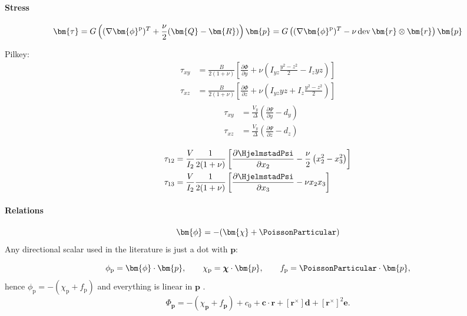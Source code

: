 \paragraph{Stress}
\begin{equation*}
\bm{\tau} = G\left((\nabla \bm{\phi}^{\rm p})^T + \frac{\nu}{2}(\bm{Q} - \bm{R})\right)\bm{p}
= G\left((\nabla \bm{\phi}^{\rm p})^T - \nu \operatorname{dev} \bm{r}\otimes\bm{r}\right)\bm{p} 
\end{equation*}

Pilkey:
$$
\begin{aligned}
\tau_{x y} & =\frac{B}{2(1+\nu)}\left[\frac{\partial \Phi}{\partial y}+\nu\left(I_{y z} \frac{y^2-z^2}{2}-I_z y z\right)\right] \\
\tau_{x z} & =\frac{B}{2(1+\nu)}\left[\frac{\partial \Phi}{\partial z}+\nu\left(I_{y z} y z+I_z \frac{y^2-z^2}{2}\right)\right]
\end{aligned}
$$
$$
\begin{aligned}
&\begin{aligned}
\tau_{x y} & =\frac{V_y}{\Delta}\left(\frac{\partial \Psi}{\partial y}-d_y\right) \\
\tau_{x z} & =\frac{V_y}{\Delta}\left(\frac{\partial \Psi}{\partial z}-d_z\right)
\end{aligned}\\
\end{aligned}
$$
\begin{equation*}
\begin{aligned}
\tau_{12}&=\frac{V}{I_2}\frac{1}{2(1+\nu)}\left[\frac{\partial \HjelmstadPsi}{\partial x_2}-\frac{\nu}{2}\left(x_2^2-x_3^2\right)\right] \\
\tau_{13}&=\frac{V}{I_2}\frac{1}{2(1+\nu)}\left[\frac{\partial \HjelmstadPsi}{\partial x_3}-\nu x_2 x_3\right]
\end{aligned}
\end{equation*}

\paragraph{Relations}
\begin{equation}
\bm{\phi}=-(\bm{\chi} + \PoissonParticular)
\end{equation}
\iffalse
Any directional scalar used in the literature is just a dot with $\bm{p}$:

$$
\phi_{\rm p}=\bm{\phi} \cdot \bm{p}, 
\qquad \chi_{\rm p}=\boldsymbol{\chi} \cdot \bm{p}, 
\qquad f_{\rm p}=\PoissonParticular \cdot \bm{p},
$$
hence $\phi_{\mathrm{p}}=-\left(\chi_{\mathrm{p}}+f_{\mathrm{p}}\right)$ and everything is linear in \(\bm{p}\) .
$$
\Phi_{\bm{p}}=-\left(\chi_{\bm{p}}+f_{\bm{p}}\right)+c_0+\mathbf{c} \cdot \bm{r}+\left[\bm{r}^{\times}\right] \mathbf{d}+\left[\bm{r}^{\times}\right]^2 \mathbf{e} .
$$


